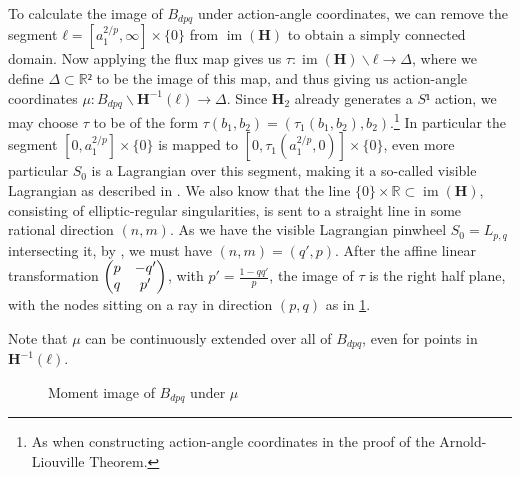\documentclass[12pt,a4paper,draft]{scrartcl}
\DeclareMathOperator{\im}{im}
\begin{document}
To calculate the image of $B_{dpq}$ under action-angle coordinates, we can remove the segment $ℓ = [a_1^{2/p},∞] × \{0\}$ from $\im(\symbf{H})$ to obtain a simply connected domain.
Now applying the flux map gives us $τ \colon \im(\symbf{H}) ∖ ℓ → Δ$, where we define $Δ ⊂ ℝ²$ to be the image of this map, and thus giving us action-angle coordinates $μ \colon B_{dpq} ∖ \symbf{H}^{-1}(ℓ) → Δ$.
Since $\symbf{H}_2$ already generates a $S¹$ action, we may choose $τ$ to be of the form $τ(b_1,b_2) = (τ_1(b_1,b_2), b_2)$.\footnote{As when constructing action-angle coordinates in the proof of the Arnold-Liouville Theorem.}
In particular the segment $[0,a_1^{2/p}] × \{0\}$ is mapped to $[0,τ_1(a_1^{2/p},0)] × \{0\}$, even more particular $S_0$ is a Lagrangian over this segment, making it a so-called visible Lagrangian as described in \cite[Chapter 5]{evans2021atfs}.
We also know that the line $\{0\} × ℝ ⊂ \im(\symbf{H})$, consisting of elliptic-regular singularities, is sent to a straight line in some rational direction $(n,m)$.
As we have the visible Lagrangian pinwheel $S_0 = L_{p,q}$ intersecting it, by \cite[Section 5.3]{evans2021atfs}, we must have $(n,m) = (q',p)$.
After the affine linear transformation $\mqty(p & -q'\\q & p')$, with $p' = \frac{1-qq'}{p}$, the image of $τ$ is the right half plane, with the nodes sitting on a ray in direction $(p,q)$ as in \cref{fig:Bdpq_moment_image}.

Note that $μ$ can be continuously extended over all of $B_{dpq}$, even for points in $\symbf{H}^{-1}(ℓ)$.


\begin{figure}
  \centering
  \caption{Moment image of $B_{dpq}$ under $μ$}
  \label{fig:Bdpq_moment_image}
\end{figure}
\end{document}
